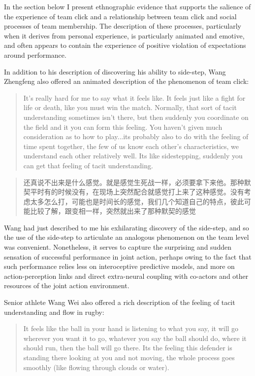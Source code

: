 \begin{CJK}{UTF8}{gbsn}
In the section below I present ethnographic evidence that supports the salience of the experience of team click and a relationship between team click and social processes of team membership.  The description of these processes, particularly when it derives from personal experience, is particularly animated and emotive, and often appears to contain the experience of positive violation of expectations around performance.

In addition to his description of discovering his ability to side-step, Wang Zhengfeng also offered an animated description of the phenomenon of team click:

  \begin{quote}
    It’s really hard for me to say what it feels like.  It feels just like a fight for life or death, like you must win the match.  Normally, that sort of tacit understanding sometimes isn’t there, but then suddenly you coordinate on the field and it you can form this feeling. You haven't given much consideration as to how to play...its probably also to do with the feeling of time spent together, the few of us know each other’s characteristics, we understand each other relatively well.  Its like sidestepping, suddenly you can get that feeling of tacit understanding.
  \end{quote}

  \begin{quote}
    还真说不出来是什么感觉。就是感觉生死战一样，必须要拿下来他。那种默契平时有的时候没有，在现场上突然配合就感觉打上来了这种感觉。没有考虑太多怎么打，可能也是时间长的感觉，我们几个知道自己的特点，彼此可能比较了解，跟变相一样，突然就出来了那种默契的感觉 
  \end{quote}

Wang had just described to me his exhilarating discovery of the side-step, and so the use of the side-step to articulate an analogous phenomenon on the team level was convenient.  Nonetheless, it serves to capture the surprising and sudden sensation of successful performance in joint action, perhaps owing to the fact that such performance relies less on interoceptive predictive models, and more on action-perception links and direct extra-neural coupling with co-actors and other resources of the joint action environment.

Senior athlete Wang Wei also offered a rich description of the feeling of tacit understanding and flow in rugby:

  \begin{quote}
    It feels like the ball in your hand is listening to what you say, it will go wherever you want it to go, whatever you say the ball should do, where it should run, then the ball will go there.  Its the feeling this defender is standing there looking at you and not moving, the whole process goes smoothly (like flowing through clouds or water).
  \end{quote}


\end{CJK}
